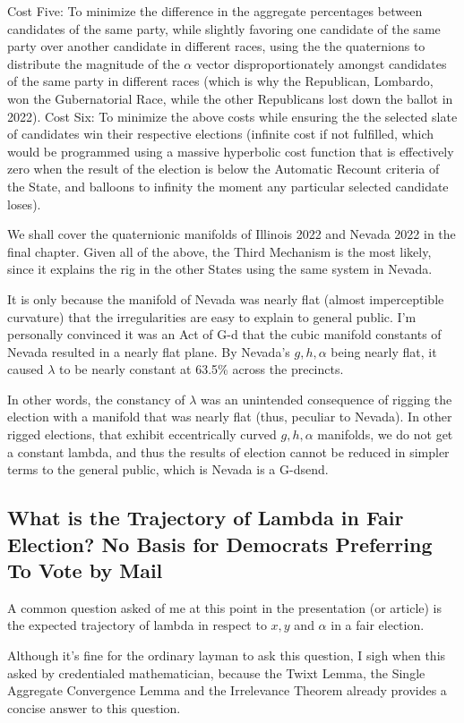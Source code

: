 Cost Five: To minimize the difference in the aggregate percentages between candidates of the same party, while slightly favoring one candidate of the same party over another candidate in different races, using the the quaternions to distribute the magnitude of the $\alpha$ vector disproportionately amongst candidates of the same party in different races (which is why the Republican, Lombardo, won the Gubernatorial Race, while the other Republicans lost down the ballot in 2022).
\newpage
Cost Six: To minimize the above costs while ensuring the the selected slate of candidates win their respective elections (infinite cost if not fulfilled, which would be programmed using a massive hyperbolic cost function that is effectively zero when the result of the election is below the Automatic Recount criteria of the State, and balloons to infinity the moment any particular selected candidate loses).

We shall cover the quaternionic manifolds of Illinois 2022 and Nevada 2022 in the final chapter. Given all of the above, the Third Mechanism is the most likely, since it explains the rig in the other States using the same system in Nevada. 

It is only because the manifold of Nevada was nearly flat (almost imperceptible curvature) that the irregularities are easy to explain to general public. I'm personally convinced it was an Act of G-d that the cubic manifold constants of Nevada resulted in a nearly flat plane. By Nevada's $g,h,\alpha$ being nearly flat, it caused $\lambda$ to be nearly constant at 63.5\% across the precincts. 

In other words, the constancy of $\lambda$ was an unintended consequence of rigging the election with a manifold that was nearly flat (thus, peculiar to Nevada). In other rigged elections, that exhibit eccentrically curved $g,h,\alpha$ manifolds, we do not get a constant lambda, and thus the results of election cannot be reduced in simpler terms to the general public, which is Nevada is a G-dsend.
\newpage
\subsection{What is the Trajectory of Lambda in Fair Election? No Basis for Democrats Preferring To Vote by Mail}
A common question asked of me at this point in the presentation (or article) is the expected trajectory of lambda in respect to $x,y$ and $\alpha$ in a fair election. 

Although it's fine for the ordinary layman to ask this question, I sigh when this asked by credentialed mathematician, because the Twixt Lemma, the Single Aggregate Convergence Lemma and the Irrelevance Theorem already provides a concise answer to this question.

